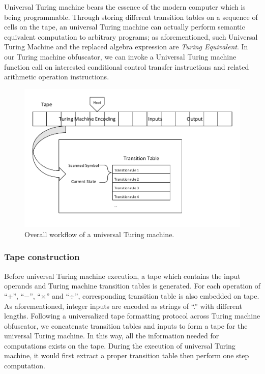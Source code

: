 \documentclass[lnicst]{svmultln}
\begin{document}
Universal Turing machine bears the essence of the modern computer which is being
programmable. Through storing different transition tables on a sequence of cells
on the tape, an universal Turing machine can actually perform semantic
equivalent computation to arbitrary programs; as aforementioned, such Universal
Turing Machine and the replaced algebra expression are \textit{Turing
  Equivalent}. In our Turing machine obfuscator, we can invoke a Universal
Turing machine function call on interested conditional control transfer instructions and related arithmetic operation
instructions.


\begin{figure}
 \includegraphics[width=\linewidth]{UTM.pdf}
 \caption{Overall workflow of a universal Turing machine.}
 \label{fig:four}
\end{figure}

\subsubsection{Tape construction}
Before universal Turing machine execution, a tape which contains the input
operands and Turing machine transition tables is generated. For each operation
of ``\(+\)'', ``\(-\)'', ``\(\times\)'' and ``\(\div\)'', corresponding
transition table is also embedded on tape. As aforementioned, integer inputs are
encoded as strings of ``.'' with different lengths. Following a universalized
tape formatting protocol across Turing machine obfuscator, we concatenate
transition tables and inputs to form a tape for the universal Turing machine. In
this way, all the information needed for computations exists on the tape. During
the execution of universal Turing machine, it would first extract a proper
transition table then perform one step computation.
\end{document}
